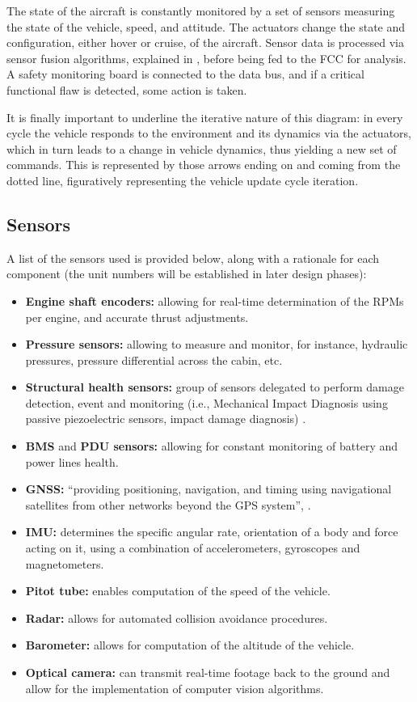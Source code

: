 The state of the aircraft is constantly monitored by a set of sensors measuring the state of the vehicle, speed, and attitude.
The actuators change the state and configuration, either hover or cruise, of the aircraft.
Sensor data is processed via sensor fusion algorithms, explained in , before being fed to the FCC for analysis.
A safety monitoring board is connected to the data bus, and if a critical functional flaw is detected, some action is taken.

It is finally important to underline the iterative nature of this diagram: in every cycle the vehicle responds to the environment and its dynamics via the actuators, which in turn leads to a change in vehicle dynamics, thus yielding a new set of commands. This is represented by those arrows ending on and coming from the dotted line, figuratively representing the vehicle update cycle iteration.

\subsection{Sensors}
A list of the sensors used is provided below, along with a rationale for each component (the unit numbers will be established in later design phases):
\begin{itemize}
    \item \textbf{Engine shaft encoders:} allowing for real-time determination of the RPMs per engine, and accurate thrust adjustments.
    \item \textbf{Pressure sensors:} allowing to measure and monitor, for instance, hydraulic pressures, pressure differential across the cabin, etc.
    \item \textbf{Structural health sensors:} group of sensors delegated to perform damage detection, event and monitoring (i.e., Mechanical Impact Diagnosis using passive piezoelectric sensors, impact damage diagnosis) \cite{hwdiagHEALTH}.
    \item \textbf{BMS} and \textbf{PDU sensors:} allowing for constant monitoring of battery and power lines health.
    \item \textbf{GNSS:} \enquote{providing positioning, navigation, and timing using navigational satellites from other networks beyond the GPS system}, \cite{gpsgov}.
    \item \textbf{IMU:} determines the specific angular rate, orientation of a body and force acting on it, using a combination of accelerometers, gyroscopes and magnetometers.
    \item \textbf{Pitot tube:} enables computation of the speed of the vehicle.
    \item \textbf{Radar:} allows for automated collision avoidance procedures.
    \item \textbf{Barometer:} allows for computation of the altitude of the vehicle.
    \item \textbf{Optical camera:} can transmit real-time footage back to the ground and allow for the implementation of computer vision algorithms.
\end{itemize}

